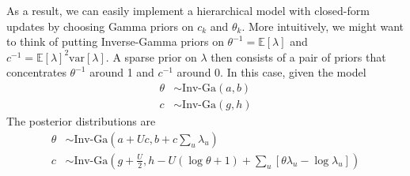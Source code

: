 \documentclass[11pt]{article}
\begin{document}
As a result, we can easily implement a hierarchical model with closed-form updates by choosing Gamma priors on $c_k$ and $\theta_k$. More intuitively, we might want to think of putting Inverse-Gamma priors on $\theta^{-1} = \mathbb{E}[\lambda]$ and $c^{-1} = \mathbb{E}[\lambda]^2 \mathrm{var}[\lambda]$. A sparse prior on $\lambda$ then consists of a pair of priors that concentrates $\theta^{-1}$ around 1 and $c^{-1}$ around 0. In this case, given the model
\begin{align}
    \theta &\sim \text{Inv-Ga}(a, b) \\
    c &\sim \text{Inv-Ga}(g, h)     
\end{align} 
The posterior distributions are
\begin{align}
    \theta &\sim \text{Inv-Ga}\left(a + Uc, b + c\sum_u \lambda_u \right) \\
    c &\sim \text{Inv-Ga}\left(g + \frac{U}{2}, h - U(\log \theta + 1) 
    + \sum_u \left[ \theta \lambda_u - \log \lambda_u \right]\right) 
\end{align}
\end{document}
